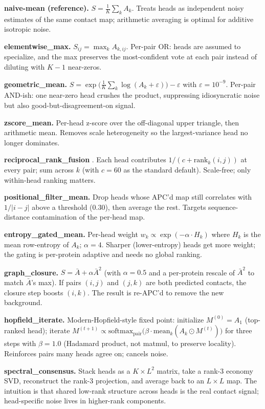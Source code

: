 \documentclass{article}
\begin{document}
\textbf{naive-mean (reference).}
$S = \tfrac{1}{K} \sum_{k} A_k$. Treats heads as independent noisy
estimates of the same contact map; arithmetic averaging is optimal
for additive isotropic noise.

\textbf{elementwise\_max.}
$S_{ij} = \max_{k} A_{k,ij}$. Per-pair OR: heads are assumed to
specialize, and the max preserves the most-confident vote at each
pair instead of diluting with $K{-}1$ near-zeros.

\textbf{geometric\_mean.}
$S = \exp\!\big(\tfrac{1}{K}\sum_{k}\log(A_k + \varepsilon)\big)
- \varepsilon$ with $\varepsilon = 10^{-9}$.
Per-pair AND-ish: one near-zero head crushes the product, suppressing
idiosyncratic noise but also good-but-disagreement-on signal.

\textbf{zscore\_mean.}
Per-head z-score over the off-diagonal upper triangle, then
arithmetic mean. Removes scale heterogeneity so the
largest-variance head no longer dominates.

\textbf{reciprocal\_rank\_fusion} \citep{cormack2009rrf}.
Each head contributes $1/(c + \text{rank}_k(i,j))$ at every pair;
sum across $k$ (with $c=60$ as the standard default). Scale-free; only
within-head ranking matters.

\textbf{positional\_filter\_mean.}
Drop heads whose APC'd map still correlates with $1/|i-j|$ above a
threshold (0.30), then average the rest. Targets sequence-distance
contamination of the per-head map.

\textbf{entropy\_gated\_mean.}
Per-head weight $w_k \propto \exp(-\alpha \cdot H_k)$ where $H_k$ is
the mean row-entropy of $A_k$; $\alpha = 4$. Sharper (lower-entropy)
heads get more weight; the gating is per-protein adaptive and needs
no global ranking.

\textbf{graph\_closure.}
$S = \bar{A} + \alpha \bar{A}^2$ (with $\alpha = 0.5$ and a per-protein
rescale of $\bar{A}^2$ to match $\bar{A}$'s max). If pairs $(i,j)$ and
$(j,k)$ are both predicted contacts, the closure step boosts $(i,k)$.
The result is re-APC'd to remove the new background.

\textbf{hopfield\_iterate.}
Modern-Hopfield-style fixed point: initialize $M^{(0)} = A_1$
(top-ranked head); iterate
$M^{(t+1)} \propto \mathrm{softmax}_{\mathrm{pair}}
\big(\beta \cdot \mathrm{mean}_k(A_k \odot M^{(t)})\big)$
for three steps with $\beta = 1.0$ (Hadamard product, not matmul, to
preserve locality). Reinforces pairs many heads agree on; cancels
noise.

\textbf{spectral\_consensus.}
Stack heads as a $K \times L^2$ matrix, take a rank-3 economy SVD,
reconstruct the rank-3 projection, and average back to an $L \times L$
map. The intuition is that shared low-rank structure across heads is
the real contact signal; head-specific noise lives in higher-rank
components.
\end{document}
